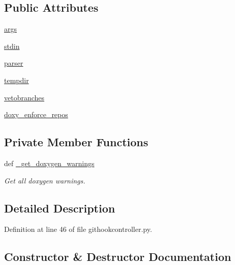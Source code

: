 \subsection*{Public Attributes}
\begin{DoxyCompactItemize}
\item 
\hyperlink{classgithookcontroller_1_1GitHookController_a86262238108e9a37e5b3ca47e4f9b94e}{args}
\item 
\hyperlink{classgithookcontroller_1_1GitHookController_a2979702282896092040b9e3adff073e5}{stdin}
\item 
\hyperlink{classgithookcontroller_1_1GitHookController_abb66a7d13f82d794351fc72184c92aa6}{parser}
\item 
\hyperlink{classgithookcontroller_1_1GitHookController_a8ba9332f051b62f8be656967a1607b16}{tempdir}
\item 
\hyperlink{classgithookcontroller_1_1GitHookController_aef6dc3b539aa239e80317038abe866aa}{vetobranches}
\item 
\hyperlink{classgithookcontroller_1_1GitHookController_aa8e96fe61c7a24a30c5d4a2abcbd49dc}{doxy\-\_\-enforce\-\_\-repos}
\end{DoxyCompactItemize}
\subsection*{Private Member Functions}
\begin{DoxyCompactItemize}
\item 
def \hyperlink{classgithookcontroller_1_1GitHookController_ad141395de7add5599a17feef12309ef3}{\-\_\-get\-\_\-doxygen\-\_\-warnings}
\begin{DoxyCompactList}\small\item\em Get all doxygen warnings. \end{DoxyCompactList}\end{DoxyCompactItemize}


\subsection{Detailed Description}


Definition at line 46 of file githookcontroller.\-py.



\subsection{Constructor \& Destructor Documentation}
